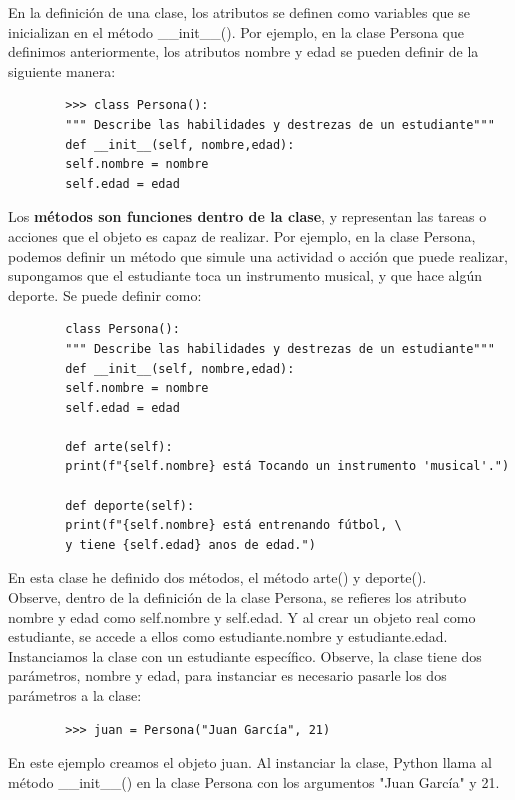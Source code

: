 {{	
	En la definición de una clase, los atributos se definen como variables que se inicializan en el método  {\ttfamily\_\!\_init\_\!\_()}. Por ejemplo, en la clase Persona que definimos anteriormente, los atributos nombre y edad se pueden definir de la siguiente manera:
	
	\begin{lstlisting}
		>>> class Persona():
		""" Describe las habilidades y destrezas de un estudiante"""
		def __init__(self, nombre,edad):
		self.nombre = nombre
		self.edad = edad 
	\end{lstlisting}
	
	Los {\bf{métodos son funciones dentro de la clase}}\label{metodo}, y representan las tareas o acciones que el objeto es capaz de realizar. Por ejemplo, en la clase {\ttfamily Persona}, podemos definir un método que simule una actividad o acción que puede realizar, supongamos que el estudiante toca un instrumento musical, y que hace algún deporte.
	Se puede definir como:
	
	\hspace{-2.5cm}{\ttfamily \scriptsize persona.py}  \vspace{-0.5cm}
	\begin{lstlisting}
		class Persona():
		""" Describe las habilidades y destrezas de un estudiante"""
		def __init__(self, nombre,edad):
		self.nombre = nombre
		self.edad = edad
		
		def arte(self):
		print(f"{self.nombre} está Tocando un instrumento 'musical'.") 
		
		def deporte(self):
		print(f"{self.nombre} está entrenando fútbol, \
		y tiene {self.edad} anos de edad.")
	\end{lstlisting}\label{persona}En esta clase he definido dos métodos, el método {\ttfamily arte()} y {\ttfamily deporte()}.\\
	
	
	Observe, dentro de la definición de la clase {\ttfamily Persona}, se refieres los atributo  {\ttfamily nombre} y  {\ttfamily edad} como {\ttfamily self.nombre} y {\ttfamily self.edad}. Y al crear un objeto real como {\ttfamily estudiante}, se accede a ellos como {\ttfamily estudiante.nombre} y {\ttfamily estudiante.edad}.\\
	
	Instanciamos la clase con un estudiante específico. Observe, la clase tiene dos parámetros, nombre y edad, para instanciar es necesario pasarle los dos parámetros a la clase:
	
	\begin{lstlisting}
		>>> juan = Persona("Juan García", 21)
	\end{lstlisting}
	En este ejemplo creamos el objeto {\ttfamily juan}. Al instanciar la clase,  Python llama al método {\ttfamily\_\!\_init\_\!\_()} en la clase {\ttfamily Persona} con los argumentos "Juan García{}"{} y 21. 
	
}}
